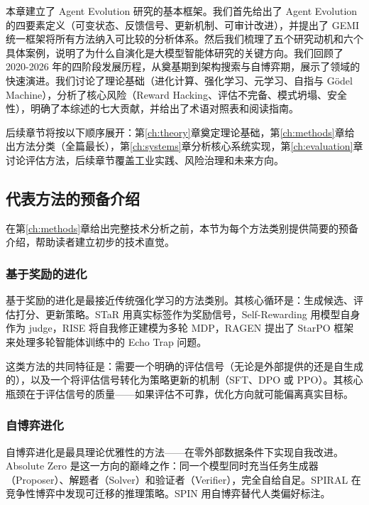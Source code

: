 本章建立了 Agent Evolution 研究的基本框架。我们首先给出了 Agent Evolution 的四要素定义（可变状态、反馈信号、更新机制、可审计改进），并提出了 GEMI 统一框架将所有方法纳入可比较的分析体系。然后我们梳理了五个研究动机和六个具体案例，说明了为什么自演化是大模型智能体研究的关键方向。我们回顾了 2020-2026 年的四阶段发展历程，从奠基期到架构搜索与自博弈期，展示了领域的快速演进。我们讨论了理论基础（进化计算、强化学习、元学习、自指与 Gödel Machine），分析了核心风险（Reward Hacking、评估不完备、模式坍塌、安全性），明确了本综述的七大贡献，并给出了术语对照表和阅读指南。

后续章节将按以下顺序展开：第\ref{ch:theory}章奠定理论基础，第\ref{ch:methods}章给出方法分类（全篇最长），第\ref{ch:systems}章分析核心系统实现，第\ref{ch:evaluation}章讨论评估方法，后续章节覆盖工业实践、风险治理和未来方向。

\subsection{代表方法的预备介绍}\label{sec:intro-methods-preview}

在第\ref{ch:methods}章给出完整技术分析之前，本节为每个方法类别提供简要的预备介绍，帮助读者建立初步的技术直觉。

\subsubsection{基于奖励的进化}

基于奖励的进化是最接近传统强化学习的方法类别。其核心循环是：生成候选、评估打分、更新策略。STaR 用真实标签作为奖励信号，Self-Rewarding 用模型自身作为 judge，RISE 将自我修正建模为多轮 MDP，RAGEN 提出了 StarPO 框架来处理多轮智能体训练中的 Echo Trap 问题。

这类方法的共同特征是：需要一个明确的评估信号（无论是外部提供的还是自生成的），以及一个将评估信号转化为策略更新的机制（SFT、DPO 或 PPO）。其核心瓶颈在于评估信号的质量——如果评估不可靠，优化方向就可能偏离真实目标。

\subsubsection{自博弈进化}

自博弈进化是最具理论优雅性的方法——在零外部数据条件下实现自我改进。Absolute Zero 是这一方向的巅峰之作：同一个模型同时充当任务生成器（Proposer）、解题者（Solver）和验证者（Verifier），完全自给自足。SPIRAL 在竞争性博弈中发现可迁移的推理策略。SPIN 用自博弈替代人类偏好标注。


